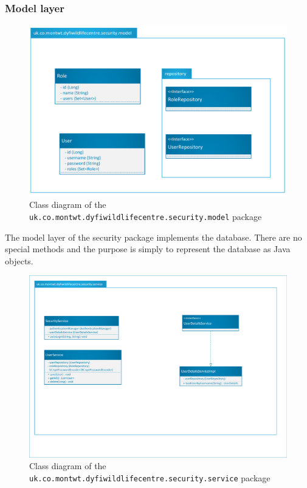 \subsubsection{Model layer}
\begin{figure}[!htbp]
	\includegraphics[scale=0.4]{diagrams/security/model}
	\caption{Class diagram of the \texttt{uk.co.montwt.dyfiwildlifecentre.security.model} package}
\end{figure}

The model layer of the security package implements the database. There are no special methods and the purpose is simply to represent the database as Java objects.

\begin{figure}[!htbp]
	\includegraphics[scale=0.4]{diagrams/security/service}
	\caption{Class diagram of the \texttt{uk.co.montwt.dyfiwildlifecentre.security.service} package}
\end{figure}

